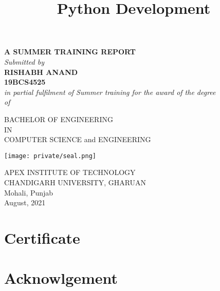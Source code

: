 \documentclass[14pt]{extarticle}
\title{Python Development}
\author{}
\date{}
\newcommand\frontmatter{
    \cleardoublepage
    \pagenumbering{roman}
}
\begin{document}
\frontmatter

\maketitle

\vspace{-5em}

\begin{center}
    \singlespacing

\textbf {A SUMMER TRAINING REPORT} \\ 
\emph {Submitted by} \\ 
\textbf {RISHABH ANAND} \\
\textbf {19BCS4525 }   \\

\vspace{1cm}
\onehalfspacing
\emph {in partial fulfilment  of Summer training for the award of the degree} \\ 
\emph {of} \\ 

\vspace{1.5cm}
\singlespacing

BACHELOR OF ENGINEERING \\
IN \\
COMPUTER SCIENCE and ENGINEERING\\

\vspace{1cm}

\texttt{[image: private/seal.png]}

\vspace{1cm}
\singlespacing

APEX INSTITUTE OF TECHNOLOGY\\
CHANDIGARH UNIVERSITY, GHARUAN\\
Mohali, Punjab \\

\onehalfspacing
August, 2021

\end{center}

\newpage
{}
\section*{Certificate}
\lipsum[10]

\newpage
{}
\section*{Acknowlgement}
\lipsum[10]
\end{document}
